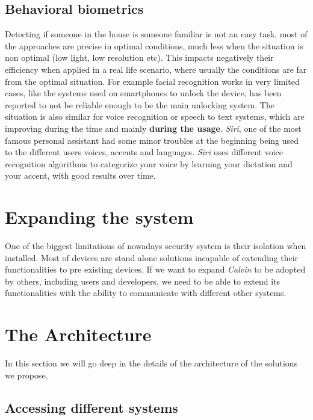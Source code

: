 \subsection{Behavioral biometrics}
Detecting if someone in the house is someone familiar is not an easy task, most
of the approaches are precise in optimal conditions, much less when the situation
is non optimal (low light, low resolution etc). This impacts negatively their efficiency
when applied in a real life scenario, where usually the conditions are far from the optimal
situation. For example facial recognition works in very limited cases, like the systems
used on smartphones to unlock the device, has been reported to not be reliable enough
to be the main unlocking system. The situation is also similar for voice recognition or
speech to text systems, which are improving during the time and mainly \textbf{during the usage}.
\textit{Siri}, one of the most famous personal assistant had some minor troubles at the beginning
being used to the different users voices, accents and languages. \textit{Siri} uses
different voice recognition algorithms to categorize your voice by learning your
dictation and your accent, with good results over time.



\section{Expanding the system}
One of the biggest limitations of nowadays security system is their isolation
when installed. Most of devices are stand alone solutions incapable of extending
their functionalities to pre existing devices. If we want to expand \textit{Calvin} to
be adopted by others, including users and developers, we need to be able to extend its
functionalities with the ability to communicate with different other systems.

\section{The Architecture}

In this section we will go deep in the details of the architecture of the solutions
we propose.

\subsection{Accessing different systems}

